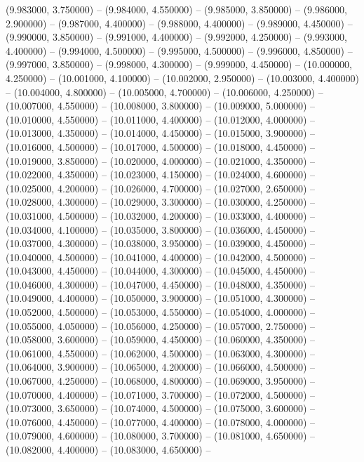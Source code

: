 (9.983000, 3.750000) -- 
(9.984000, 4.550000) -- 
(9.985000, 3.850000) -- 
(9.986000, 2.900000) -- 
(9.987000, 4.400000) -- 
(9.988000, 4.400000) -- 
(9.989000, 4.450000) -- 
(9.990000, 3.850000) -- 
(9.991000, 4.400000) -- 
(9.992000, 4.250000) -- 
(9.993000, 4.400000) -- 
(9.994000, 4.500000) -- 
(9.995000, 4.500000) -- 
(9.996000, 4.850000) -- 
(9.997000, 3.850000) -- 
(9.998000, 4.300000) -- 
(9.999000, 4.450000) -- 
(10.000000, 4.250000) -- 
(10.001000, 4.100000) -- 
(10.002000, 2.950000) -- 
(10.003000, 4.400000) -- 
(10.004000, 4.800000) -- 
(10.005000, 4.700000) -- 
(10.006000, 4.250000) -- 
(10.007000, 4.550000) -- 
(10.008000, 3.800000) -- 
(10.009000, 5.000000) -- 
(10.010000, 4.550000) -- 
(10.011000, 4.400000) -- 
(10.012000, 4.000000) -- 
(10.013000, 4.350000) -- 
(10.014000, 4.450000) -- 
(10.015000, 3.900000) -- 
(10.016000, 4.500000) -- 
(10.017000, 4.500000) -- 
(10.018000, 4.450000) -- 
(10.019000, 3.850000) -- 
(10.020000, 4.000000) -- 
(10.021000, 4.350000) -- 
(10.022000, 4.350000) -- 
(10.023000, 4.150000) -- 
(10.024000, 4.600000) -- 
(10.025000, 4.200000) -- 
(10.026000, 4.700000) -- 
(10.027000, 2.650000) -- 
(10.028000, 4.300000) -- 
(10.029000, 3.300000) -- 
(10.030000, 4.250000) -- 
(10.031000, 4.500000) -- 
(10.032000, 4.200000) -- 
(10.033000, 4.400000) -- 
(10.034000, 4.100000) -- 
(10.035000, 3.800000) -- 
(10.036000, 4.450000) -- 
(10.037000, 4.300000) -- 
(10.038000, 3.950000) -- 
(10.039000, 4.450000) -- 
(10.040000, 4.500000) -- 
(10.041000, 4.400000) -- 
(10.042000, 4.500000) -- 
(10.043000, 4.450000) -- 
(10.044000, 4.300000) -- 
(10.045000, 4.450000) -- 
(10.046000, 4.300000) -- 
(10.047000, 4.450000) -- 
(10.048000, 4.350000) -- 
(10.049000, 4.400000) -- 
(10.050000, 3.900000) -- 
(10.051000, 4.300000) -- 
(10.052000, 4.500000) -- 
(10.053000, 4.550000) -- 
(10.054000, 4.000000) -- 
(10.055000, 4.050000) -- 
(10.056000, 4.250000) -- 
(10.057000, 2.750000) -- 
(10.058000, 3.600000) -- 
(10.059000, 4.450000) -- 
(10.060000, 4.350000) -- 
(10.061000, 4.550000) -- 
(10.062000, 4.500000) -- 
(10.063000, 4.300000) -- 
(10.064000, 3.900000) -- 
(10.065000, 4.200000) -- 
(10.066000, 4.500000) -- 
(10.067000, 4.250000) -- 
(10.068000, 4.800000) -- 
(10.069000, 3.950000) -- 
(10.070000, 4.400000) -- 
(10.071000, 3.700000) -- 
(10.072000, 4.500000) -- 
(10.073000, 3.650000) -- 
(10.074000, 4.500000) -- 
(10.075000, 3.600000) -- 
(10.076000, 4.450000) -- 
(10.077000, 4.400000) -- 
(10.078000, 4.000000) -- 
(10.079000, 4.600000) -- 
(10.080000, 3.700000) -- 
(10.081000, 4.650000) -- 
(10.082000, 4.400000) -- 
(10.083000, 4.650000) -- 
